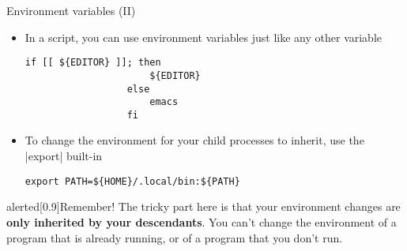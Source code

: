 \begin{frame}[fragile]{Environment variables (II)}
    \vspace{-3mm}
    \begin{itemize}
        \item In a script, you can use environment variables just like any other variable
              \begin{lstlisting}[style=MyBash, numbers=none, aboveskip=2mm, belowskip=-4mm, xrightmargin=30mm]
                  if [[ ${EDITOR} ]]; then
                      ${EDITOR}
                  else
                      emacs
                  fi
              \end{lstlisting}
        \item To change the environment \alert{for your child processes} to inherit, use the \bash|export| built-in
              \begin{lstlisting}[style=MyBash, numbers=none, aboveskip=2mm, xrightmargin=30mm]
                  export PATH=${HOME}/.local/bin:${PATH}
              \end{lstlisting}
    \end{itemize}
    \begin{varblock}{alerted}[0.9\textwidth]{Remember!}
        The tricky part here is that your environment changes are \alert{\textbf{only inherited by your descendants}}.
        You can't change the environment of a program that is already running, or of a program that you don't run. 
    \end{varblock}
\end{frame}
